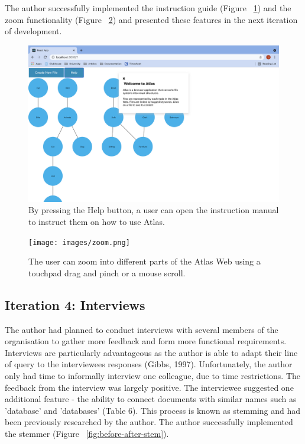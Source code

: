 \documentclass{article}
\begin{document}
The author successfully implemented the instruction guide (Figure ~\ref{fig:help}) and the zoom functionality (Figure ~\ref{fig:zoom}) and presented these features in the next iteration of development.

\begin{figure}[!htb]
  \centering
      \includegraphics[width=1\textwidth]{images/help.png}
  \caption{By pressing the Help button, a user can open the instruction manual to instruct them on how to use Atlas.}
  \label{fig:help}
\end{figure}


\begin{figure}[!htb]
  \centering
      \texttt{[image: images/zoom.png]}
  \caption{The user can zoom into different parts of the Atlas Web using a touchpad drag and pinch or a mouse scroll.}
  \label{fig:zoom}
\end{figure}

\newpage
\subsection{Iteration 4: Interviews}

The author had planned to conduct interviews with several members of the organisation to gather more feedback and form more functional requirements. Interviews are particularly advantageous as the author is able to adapt their line of query to the interviewees responses (Gibbs, 1997). Unfortunately, the author only had time to informally interview one colleague, due to time restrictions. The feedback from the interview was largely positive. The interviewee suggested one additional feature - the ability to connect documents with similar names such as 'database' and 'databases' (Table 6). This process is known as stemming and had been previously researched by the author. The author successfully implemented the stemmer (Figure ~\ref{fig:before-after-stem}).
\end{document}
